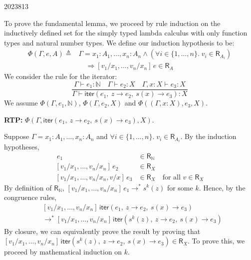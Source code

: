 \documentclass[10pt,\jkfside,a4paper]{article}
\newcommand{\answer}[1]{
    \begin{tcolorbox}[colframe=black, colback=white, sharp corners, boxrule=0.2mm, breakable]
        #1
    \end{tcolorbox}
}
\begin{document}
\begin{examquestion}{2023}{8}{13}
\begin{enumerate}
            \answer{
                To prove the fundamental lemma, we proceed by rule induction on the inductively defined set for the simply typed lambda calculus with only function types and natural number types. We define our induction hypothesis to be:
                \begin{align*}
                    \Phi(\Gamma, e, A) \triangleq{} & \Gamma = x_1 : A_1, \ldots, x_n : A_n \wedge (\forall i \in \{1, \ldots, n\}.\; v_i \in \mathsf{R}_{A_i}) \\
                    & \quad \Rightarrow [v_1/x_1, \ldots, v_n/x_n]\,e \in \mathsf{R}_A
                \end{align*}
                We consider the rule for the iterator:
                \[
                    \frac{\Gamma \vdash e_1 : \mathbb{N} \quad \Gamma \vdash e_2 : X \quad \Gamma, x:X \vdash e_3 : X}{\Gamma \vdash \mathsf{iter}(e_1,\ z \to e_2,\ s(x) \to e_3) : X}
                \]
                We assume $\Phi(\Gamma, e_1, \mathbb{N})$, $\Phi(\Gamma, e_2, X)$ and $\Phi((\Gamma, x:X), e_3, X)$.

                \textbf{RTP:} $\Phi(\Gamma, \mathsf{iter}(e_1,\ z \to e_2,\ s(x) \to e_3), X)$.

                Suppose $\Gamma = x_1 : A_1, \ldots, x_n : A_n$ and $\forall i \in \{1, \ldots, n\}.\; v_i \in \mathsf{R}_{A_i}$. By the induction hypotheses,
                \begin{align*}
                    [v_1/x_1, \ldots, v_n/x_n]\,e_1 &\in \mathsf{R}_{\mathbb{N}} \\
                    [v_1/x_1, \ldots, v_n/x_n]\,e_2 &\in \mathsf{R}_X \\
                    [v_1/x_1, \ldots, v_n/x_n, v/x]\,e_3 &\in \mathsf{R}_X \quad \text{for all } v \in \mathsf{R}_X
                \end{align*}
                By definition of $\mathsf{R}_{\mathbb{N}}$, $[v_1/x_1, \ldots, v_n/x_n]\,e_1 \to^* s^k(z)$ for some $k$. Hence, by the congruence rules,
                \begin{align*}
                    & [v_1/x_1, \ldots, v_n/x_n]\,\mathsf{iter}(e_1,\ z \to e_2,\ s(x) \to e_3) \\
                    &\to^* [v_1/x_1, \ldots, v_n/x_n]\,\mathsf{iter}(s^k(z),\ z \to e_2,\ s(x) \to e_3)
                \end{align*}
                By closure, we can equivalently prove the result by proving that $[v_1/x_1, \ldots, v_n/x_n]\,\mathsf{iter}(s^k(z),\ z \to e_2,\ s(x) \to e_3) \in \mathsf{R}_X$. To prove this, we proceed by mathematical induction on $k$.

}
\end{enumerate}
\end{examquestion}
\end{document}
